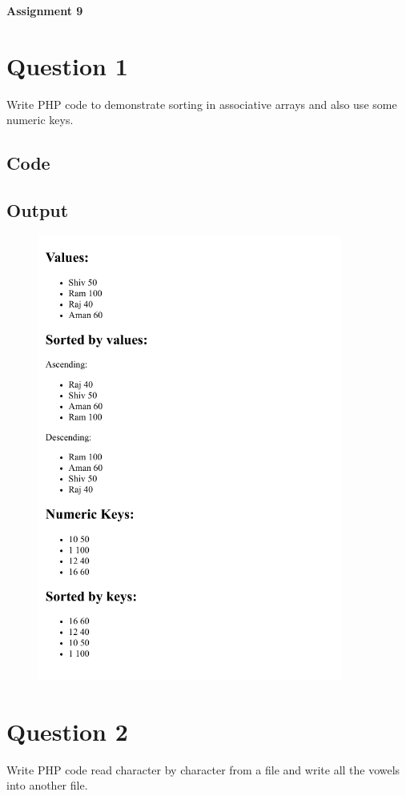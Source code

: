 \documentclass{article}
\begin{document}

{\centerline{\bfseries \Huge Assignment 9}}

\section*{Question 1}
Write PHP code to demonstrate sorting in associative arrays and
also use some numeric keys.
\subsection*{Code}

\subsection*{Output}
\begin{figure}[H]
  \centering
  \includegraphics[width=10cm]{1/out.png}
\end{figure}

\newpage
\section*{Question 2}
Write PHP code read character by character from a file and write all
the vowels into another file.
\end{document}
